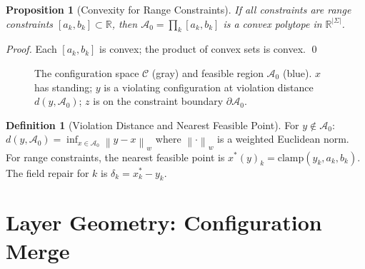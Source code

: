 \documentclass[12pt, letterpaper]{report}
\theoremstyle{plain}
\newtheorem{proposition}[theorem]{Proposition}
\theoremstyle{definition}
\newtheorem{definition}[theorem]{Definition}
\theoremstyle{remark}
\newcommand{\R}{\mathbb{R}}
\newcommand{\CC}{\mathcal{C}}
\newcommand{\norm}[1]{\left\lVert #1 \right\rVert}
\begin{document}
\begin{proposition}[Convexity for Range Constraints]
If all constraints are range constraints $[a_k, b_k] \subset \R$,
then $\mathcal{A}_0 = \prod_k [a_k, b_k]$ is a convex polytope in $\R^{|\Sigma|}$.
\end{proposition}

\begin{proof}
Each $[a_k, b_k]$ is convex; the product of convex sets is convex. \qed
\end{proof}

\begin{figure}[h]
\centering
{}
\caption{The configuration space $\CC$ (gray) and feasible region $\mathcal{A}_0$
(blue). $x$ has standing; $y$ is a violating configuration at violation distance
$d(y,\mathcal{A}_0)$; $z$ is on the constraint boundary $\partial\mathcal{A}_0$.}
\label{fig:feasible}
\end{figure}

\begin{definition}[Violation Distance and Nearest Feasible Point]
For $y \notin \mathcal{A}_0$:
$d(y, \mathcal{A}_0) = \inf_{x \in \mathcal{A}_0} \norm{y-x}_w$
where $\norm{\cdot}_w$ is a weighted Euclidean norm.
For range constraints, the nearest feasible point is
$x^*(y)_k = \mathrm{clamp}(y_k, a_k, b_k)$.
The field repair for $k$ is $\delta_k = x^*_k - y_k$.
\end{definition}

\section{Layer Geometry: Configuration Merge}
\end{document}
